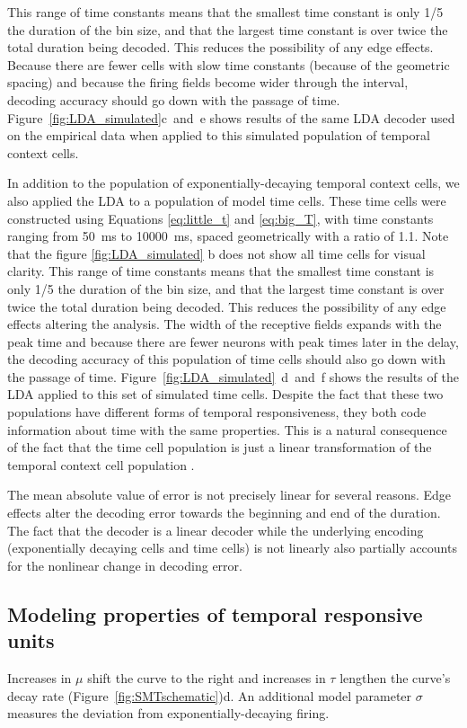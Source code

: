 \documentclass{apa}
\begin{document}
This range of time constants means that the smallest time constant is only 1/5 the duration of the bin size, and that the largest time constant is over twice the total duration being decoded.  This reduces the possibility of any edge effects.
Because there are fewer cells with slow time constants (because of the geometric spacing) and because the firing fields become wider through the interval, decoding accuracy should go down with the
passage of time.  
Figure~\ref{fig:LDA_simulated}c~and~e shows results of the same LDA decoder used on
the empirical data when applied to this simulated population of  temporal
context cells.  

In addition to the population of exponentially-decaying temporal context
cells, we also applied the LDA to a population of model time cells.  
These time cells were constructed using Equations \eqref{eq:little_t} and \eqref{eq:big_T}, with time constants ranging from 50~ms to 10000~ms, spaced geometrically with a ratio of 1.1. 
Note that the figure \ref{fig:LDA_simulated} b does not show all time cells for visual clarity.
This range of time constants means that the smallest time constant is only 1/5 the duration of the bin size, and that the largest time constant is over twice the total duration being decoded.  This reduces the possibility of any edge effects altering the analysis.
 The width of the receptive fields expands with the peak time and
because there are fewer neurons with peak times later in the delay, the
decoding accuracy of this population of time cells should also go down with
the passage of time.
Figure~\ref{fig:LDA_simulated}~d~and~f shows the results of the LDA applied to
this set of simulated time cells.  Despite the fact that these two populations
have different forms of temporal responsiveness, they both code information
about time with the same properties.  This is a natural consequence of the
fact that the time cell population is just a linear transformation of the
temporal context cell population \cite{ShanHowa13}. 

The mean absolute value of error is not precisely linear for several reasons.  Edge effects alter the decoding error towards the beginning and end of the duration.  The fact that the decoder is a linear decoder while the underlying encoding (exponentially decaying cells and time cells) is not linearly also partially accounts for the nonlinear change in decoding error.


\subsection{Modeling properties of temporal responsive units}
Increases in
$\mu$ shift the curve to the right and increases in $\tau$ lengthen the
curve's decay rate (Figure~\ref{fig:SMTschematic})d. 
An additional model parameter $\sigma$ measures the deviation from exponentially-decaying
firing. 
\end{document}
